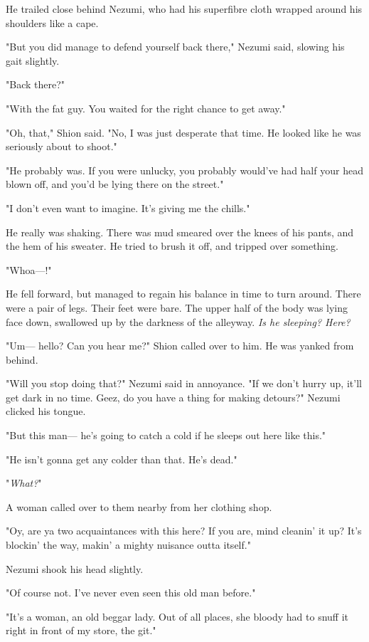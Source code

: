 He trailed close behind Nezumi, who had his superfibre cloth wrapped
around his shoulders like a cape.

"But you did manage to defend yourself back there," Nezumi said, slowing
his gait slightly.

"Back there?"

"With the fat guy. You waited for the right chance to get away."

"Oh, that," Shion said. "No, I was just desperate that time. He looked
like he was seriously about to shoot."

"He probably was. If you were unlucky, you probably would've had half
your head blown off, and you'd be lying there on the street."

"I don't even want to imagine. It's giving me the chills."

He really was shaking. There was mud smeared over the knees of his
pants, and the hem of his sweater. He tried to brush it off, and tripped
over something.

"Whoa---!"

He fell forward, but managed to regain his balance in time to turn
around. There were a pair of legs. Their feet were bare. The upper half
of the body was lying face down, swallowed up by the darkness of the
alleyway. \emph{Is he sleeping? Here?}

"Um--- hello? Can you hear me?" Shion called over to him. He was yanked
from behind.

"Will you stop doing that?" Nezumi said in annoyance. "If we don't hurry
up, it'll get dark in no time. Geez, do you have a thing for making
detours?" Nezumi clicked his tongue.

"But this man--- he's going to catch a cold if he sleeps out here like
this."

"He isn't gonna get any colder than that. He's dead."

"\emph{What?}"

A woman called over to them nearby from her clothing shop.

"Oy, are ya two acquaintances with this here? If you are, mind cleanin'
it up? It's blockin' the way, makin' a mighty nuisance outta itself."

Nezumi shook his head slightly.

"Of course not. I've never even seen this old man before."

"It's a woman, an old beggar lady. Out of all places, she bloody had to
snuff it right in front of my store, the git."

